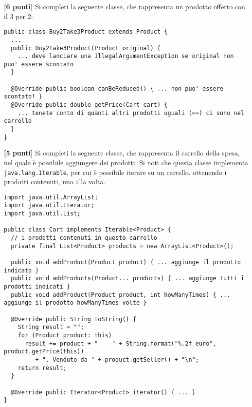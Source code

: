 \documentclass{article}[10pt]
\newcounter{esnu}
\newenvironment{esercizio}{\medskip \noindent {\bf Esercizio\addtocounter{esnu}{1} \arabic{esnu}}}{}
\begin{document}
\begin{esercizio}
\textbf{[6 punti]}
Si completi la seguente classe, che rappresenta un prodotto offerto con il 3 per 2:
%
{\small
\begin{verbatim}
public class Buy2Take3Product extends Product {
  ...
  public Buy2Take3Product(Product original) {
    ... deve lanciare una IllegalArgumentException se original non puo' essere scontato
  }

  @Override public boolean canBeReduced() { ... non puo' essere scontato! }
  @Override public double getPrice(Cart cart) {
    ... tenete conto di quanti altri prodotti uguali (==) ci sono nel carrello
  }
}
\end{verbatim}}

\end{esercizio}

\begin{esercizio}
\textbf{[5 punti]}
Si completi la seguente classe, che rappresenta il carrello della spesa, nel quale
\`e possibile aggiungere dei prodotti. Si noti che questa classe implementa
\texttt{java.lang.Iterable}, per cui \`e possibile iterare su un carrello, ottenendo i prodotti
contenuti, uno alla volta.
%
{\small
\begin{verbatim}
import java.util.ArrayList;
import java.util.Iterator;
import java.util.List;

public class Cart implements Iterable<Product> {
  // i prodotti contenuti in questo carrello
  private final List<Product> products = new ArrayList<Product>();

  public void addProduct(Product product) { ... aggiunge il prodotto indicato }
  public void addProducts(Product... products) { ... aggiunge tutti i prodotti indicati }
  public void addProduct(Product product, int howManyTimes) { ... aggiunge il prodotto howManyTimes volte }

  @Override public String toString() {
    String result = "";
    for (Product product: this)
      result += product + "    " + String.format("%.2f euro", product.getPrice(this))
         + ". Venduto da " + product.getSeller() + "\n";
    return result;
  }

  @Override public Iterator<Product> iterator() { ... }
}
\end{verbatim}}
\end{esercizio}
\end{document}

